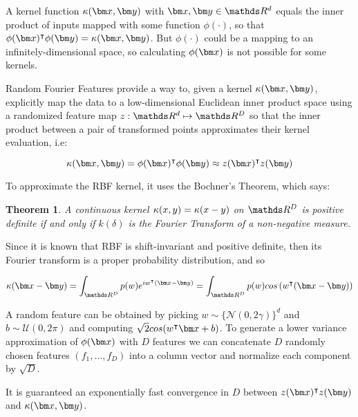 \begin{pre-delivery}
  A kernel function
  $\kernel(\vx, \vy)$ with $\vx, \vy \in \reals^d$
  equals the inner product of inputs mapped with some function $\phi(\cdot)$,
  so that
  $\phi(\vx)^\transp\phi(\vy) = \kernel(\vx, \vy)$.
  But $\phi(\cdot)$ could be a mapping to an infinitely-dimensional space, so
  calculating $\phi(\vx)$ is not possible for some kernels.

  Random Fourier Features provide a way to, given a kernel $\kernel(\vx, \vy)$,
  explicitly map the data to a
  low-dimensional Euclidean inner product space using a randomized feature
  map $z: \reals^d \mapsto \reals^D$ so that the inner product between a pair
  of transformed points approximates their kernel evaluation, i.e:

  \begin{equation}
    \kernel(\vx, \vy) = \phi(\vx)^\transp\phi(\vy) \approx z(\vx)^\transp z(\vy)
  \end{equation}

  To approximate the RBF kernel, it uses the Bochner's Theorem, which says:

\newtheorem{theorem}{Theorem}
  \begin{theorem}
    \cite{rudin1962fourier}
    A continuous kernel $\kappa(x, y) = \kappa(x - y)$ on $\reals^D$  is
    positive definite if and only if $k(\delta)$ is the
    Fourier Transform of a non-negative measure.
  \end{theorem}


  Since it is known that RBF is shift-invariant and positive definite, then
  its Fourier transform is a proper probability distribution, and so

  \begin{equation}
    \kernel(\vx - \vy) = \int_{\reals^D} p(w)e^{iw^\transp (\vx-\vy)}
    = \int_{\reals^D} p(w)cos\left(w^\transp (\vx-\vy)\right)
  \end{equation}

  A random feature can be obtained by picking $w \sim \{\mathcal{N}(0, 2\gamma)\}^d$
  and $b \sim \mathcal{U}(0, 2\pi)$
  and computing $\sqrt{2}cos(w^\transp\vx + b)$. To generate a lower variance
  approximation of $\phi(\vx)$ with $D$ features we can concatenate $D$ randomly
  chosen features $(f_1, \ldots, f_D)$ into a column vector and normalize each
  component by $\sqrt{D}$.

  It is guaranteed an exponentially fast convergence in $D$ between
  $z(\vx)^\transp z(\vy)$ and $\kernel(\vx, \vy)$.

\end{pre-delivery}

